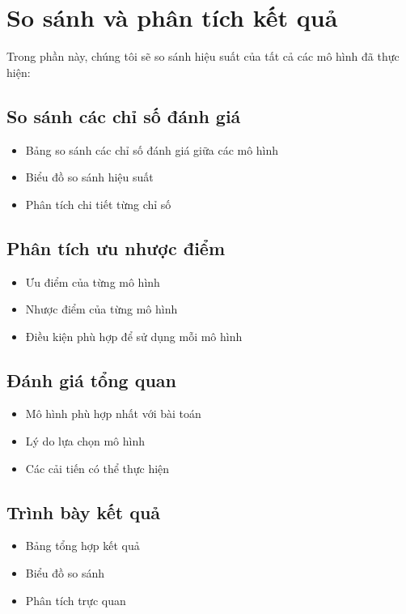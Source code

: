 \section{So sánh và phân tích kết quả}

Trong phần này, chúng tôi sẽ so sánh hiệu suất của tất cả các mô hình đã thực hiện:

\subsection{So sánh các chỉ số đánh giá}
\begin{itemize}
    \item Bảng so sánh các chỉ số đánh giá giữa các mô hình
    \item Biểu đồ so sánh hiệu suất
    \item Phân tích chi tiết từng chỉ số
\end{itemize}

\subsection{Phân tích ưu nhược điểm}
\begin{itemize}
    \item Ưu điểm của từng mô hình
    \item Nhược điểm của từng mô hình
    \item Điều kiện phù hợp để sử dụng mỗi mô hình
\end{itemize}

\subsection{Đánh giá tổng quan}
\begin{itemize}
    \item Mô hình phù hợp nhất với bài toán
    \item Lý do lựa chọn mô hình
    \item Các cải tiến có thể thực hiện
\end{itemize}

\subsection{Trình bày kết quả}
\begin{itemize}
    \item Bảng tổng hợp kết quả
    \item Biểu đồ so sánh
    \item Phân tích trực quan
\end{itemize} 